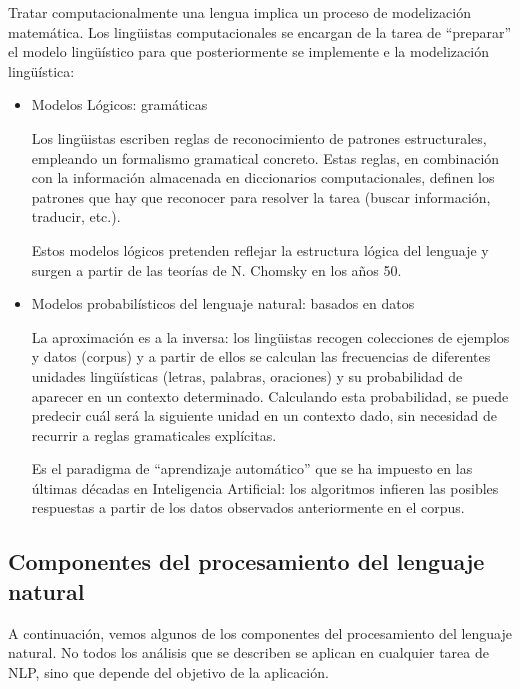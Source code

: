 \documentclass[runningheads]{llncs}
\begin{document}
Tratar computacionalmente una lengua implica un proceso de modelización matemática. Los lingüistas computacionales se encargan de la tarea de “preparar” el modelo lingüístico para que posteriormente se implemente e la modelización lingüística:
\begin{itemize}


\item{Modelos Lógicos: gramáticas

Los lingüistas escriben reglas de reconocimiento de patrones estructurales, empleando un formalismo gramatical concreto. Estas reglas, en combinación con la información almacenada en diccionarios computacionales, definen los patrones que hay que reconocer para resolver la tarea (buscar información, traducir, etc.).

Estos modelos lógicos pretenden reflejar la estructura lógica del lenguaje y surgen a partir de las teorías de N. Chomsky en los años 50.} 


\item{Modelos probabilísticos del lenguaje natural: basados en datos

La aproximación es a la inversa: los lingüistas recogen colecciones de ejemplos y datos (corpus) y a partir de ellos se calculan las frecuencias de diferentes unidades lingüísticas (letras, palabras, oraciones) y su probabilidad de aparecer en un contexto determinado. Calculando esta probabilidad, se puede predecir cuál será la siguiente unidad en un contexto dado, sin necesidad de recurrir a reglas gramaticales explícitas.

Es el paradigma de “aprendizaje automático” que se ha impuesto en las últimas décadas en Inteligencia Artificial: los algoritmos infieren las posibles respuestas a partir de los datos observados anteriormente en el corpus.}
\end{itemize}

\subsection{Componentes del procesamiento del lenguaje natural}

A continuación, vemos algunos de los componentes del procesamiento del lenguaje natural. No todos los análisis que se describen se aplican en cualquier tarea de NLP, sino que depende del objetivo de la aplicación.
\end{document}

